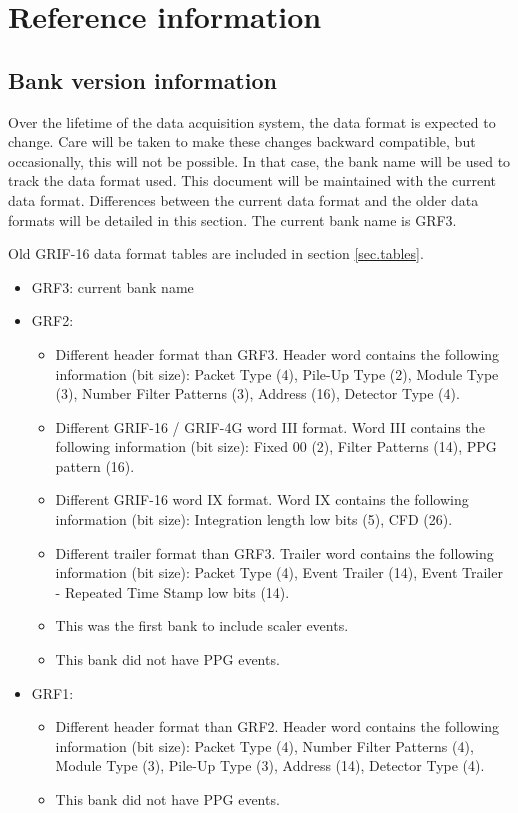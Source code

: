 \documentclass[letterpaper,12pt,notitlepage]{report}
\begin{document}
\chapter{Reference information}

\section{Bank version information}
Over the lifetime of the data acquisition system, the data format is expected to change. Care will be taken to make these changes backward compatible, but occasionally, this will not be possible. In that case, the bank name will be used to track the data format used. This document will be maintained with the current data format. Differences between the current data format and the older data formats will be detailed in this section. The current bank name is GRF3.

Old GRIF-16 data format tables are included in section \ref{sec.tables}.

\begin{itemize}
\item GRF3: current bank name
\item GRF2:
	\begin{itemize}
		\item Different header format than GRF3. Header word contains the following information (bit size): Packet Type (4), Pile-Up Type (2), Module Type (3), Number Filter Patterns (3), Address (16), Detector Type (4).
      \item Different GRIF-16 / GRIF-4G word III format. Word III contains the following information (bit size): Fixed 00 (2), Filter Patterns (14), PPG pattern (16).
      \item Different GRIF-16 word IX format. Word IX contains the following information (bit size): Integration length low bits (5), CFD (26).
		\item Different trailer format than GRF3. Trailer word contains the following information (bit size): Packet Type (4), Event Trailer (14), Event Trailer - Repeated Time Stamp low bits (14).
		\item This was the first bank to include scaler events.
      \item This bank did not have PPG events.
	\end{itemize}
\item GRF1:
	\begin{itemize}
		\item Different header format than GRF2. Header word contains the following information (bit size): Packet Type (4), Number Filter Patterns (4), Module Type (3), Pile-Up Type (3), Address (14), Detector Type (4).
      \item This bank did not have PPG events.
	\end{itemize}
\end{itemize}
\end{document}
